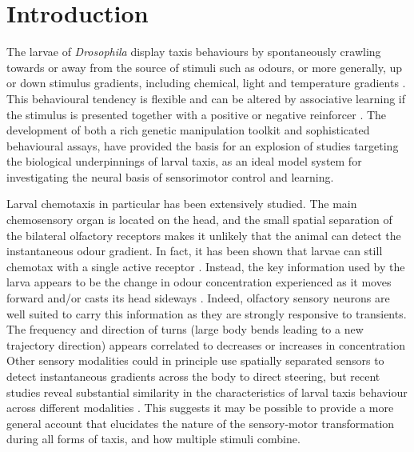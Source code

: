 \documentclass[10pt,a4paper]{article}
\newcommand{\Dros }{\emph{Drosophila }}
\begin{document}
\section{Introduction}
The larvae of \Dros display taxis behaviours by spontaneously crawling towards or away from the source of stimuli such as odours, or more generally, up or down stimulus gradients, including chemical, light and temperature gradients \citep{luo2010navigational,gomez2011active,gomez2012active,gomez2014multilevel,kane2013sensorimotor,klein2015sensory}. This behavioural tendency is flexible and can be altered by associative learning if the stimulus is presented together with a positive or negative reinforcer \citep{ache2005olfaction,scherer2003olfactory,gerber2004engram,diegelmann2013maggot,schleyer2015learning}. The development of both a rich genetic manipulation toolkit and sophisticated behavioural assays, \citep{gerber2009smelling,diegelmann2013maggot} 
have provided the basis for an explosion of studies targeting the biological underpinnings of larval taxis, as an ideal model system for investigating the neural basis of sensorimotor control and learning.

Larval chemotaxis in particular has been extensively studied. The main chemosensory organ is located on the head, and the small spatial separation of the bilateral olfactory receptors makes it unlikely that the animal can detect the instantaneous odour gradient. In fact, it has been shown that larvae can still chemotax with a single active receptor  \citep{fishilevich2005chemotaxis,gomez2010mechanisms,louis2008bilateral}. Instead, the key information used by the larva  appears to be the change in odour concentration experienced as it moves forward and/or casts its head sideways \citep{gomez2010mechanisms}. 
Indeed, olfactory sensory neurons are well suited to carry this information as they are strongly responsive to transients\citep{de2013common,nagel2011biophysical,kim2011system,schulze2015dynamical}. The frequency and direction of turns (large body bends leading to a new trajectory direction) appears correlated to  decreases or increases in concentration  \citep{hernandez2015reverse,schulze2015dynamical}
  Other sensory modalities could in principle use spatially separated sensors to detect instantaneous gradients across the body to direct steering, but%
recent studies reveal substantial similarity in the characteristics of larval taxis behaviour across different modalities \citep{gepner2015computations, bellmann2010optogenetically, lahiri2011two}. This suggests it may be possible to provide a more general account that elucidates the nature of the sensory-motor transformation during all forms of taxis, and how multiple stimuli combine. 
\end{document}
